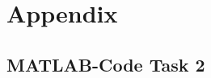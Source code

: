 \renewcommand{\thesubsection}{\thesection.\arabic{subsection}}
\appendix
\section{Appendix}
\subsection{MATLAB-Code Task 2}
\label{apx:matlab}

\begin{center}
	
\end{center}



